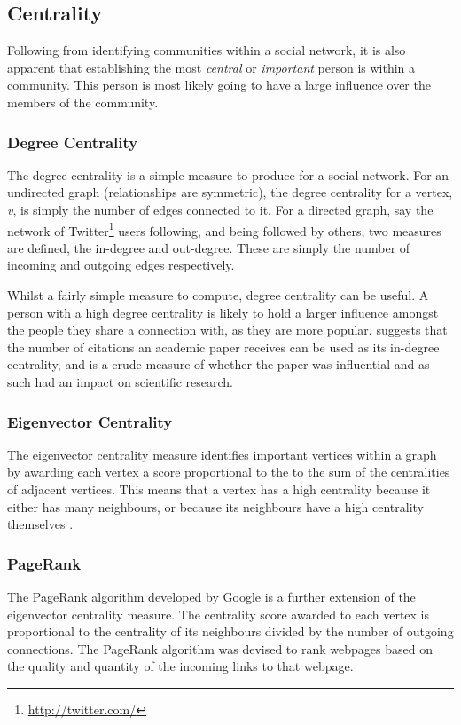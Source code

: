 \subsection{Centrality}
Following from identifying communities within a social network, it is also apparent that establishing the most \emph{central} or \emph{important} person is within a community. This person is most likely going to have a large influence over the members of the community.

\subsubsection{Degree Centrality}
The degree centrality is a simple measure to produce for a social network. For an undirected graph (relationships are symmetric), the degree centrality for a vertex, \emph{v}, is simply the number of edges connected to it. For a directed graph, say the network of Twitter\footnote{\url{http://twitter.com/}} users following, and being followed by others, two measures are defined, the in-degree and out-degree. These are simply the number of incoming and outgoing edges respectively.

Whilst a fairly simple measure to compute, degree centrality can be useful. A person with a high degree centrality is likely to hold a larger influence amongst the people they share a connection with, as they are more popular. \cite[p.~169]{newman10} suggests that the number of citations an academic paper receives can be used as its in-degree centrality, and is a crude measure of whether the paper was influential and as such had an impact on scientific research.

\subsubsection{Eigenvector Centrality}
The eigenvector centrality measure identifies important vertices within a graph by awarding each vertex a score proportional to the to the sum of the centralities of adjacent vertices. This means that a vertex has a high centrality because it either has many neighbours, or because its neighbours have a high centrality themselves \cite{newman10}.

\subsubsection{PageRank}
The PageRank algorithm \cite{pagerank} developed by Google is a further extension of the eigenvector centrality measure. The centrality score awarded to each vertex is proportional to the centrality of its neighbours divided by the number of outgoing connections. The PageRank algorithm was devised to rank webpages based on the quality and quantity of the incoming links to that webpage.

